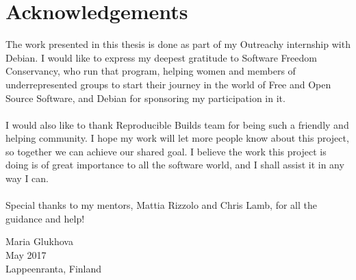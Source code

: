 \section*{Acknowledgements}

The work presented in this thesis is done as part of my Outreachy internship
with Debian. I would like to express my deepest gratitude to Software Freedom
Conservancy, who run that program, helping women and members of
underrepresented groups to start their journey in the world of Free and Open
Source Software, and Debian for sponsoring my participation in it.\\\\
I would also like to thank Reproducible Builds team for being such a
friendly and helping community. I hope my work will let more people
know about this project, so together we can achieve our shared goal.
I believe the work this project is doing is of great importance to all
the software world, and I shall assist it in any way I can.\\\\
Special thanks to my mentors, Mattia Rizzolo and Chris Lamb, for all the guidance and help!

Maria Glukhova\\
May 2017\\
Lappeenranta, Finland\\
